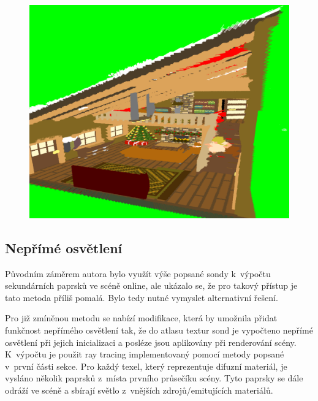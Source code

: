 \begin{figure}[H]
	\centering
	\includegraphics[scale=1]{images/probe_scene_render.png}
	\captionsetup{justification=centering}
	\label{fig:lfp_scene_render}
\end{figure}

\subsection{Nepřímé osvětlení}\label{sec:indirect}
Původním záměrem autora bylo využít výše popsané sondy k~výpočtu sekundárních paprsků ve scéně online, ale ukázalo se, že pro takový přístup je tato metoda příliš pomalá. Bylo tedy nutné vymyslet alternativní řešení. 

Pro již zmíněnou metodu se nabízí modifikace, která by umožnila přidat funkčnost nepřímého osvětlení tak, že do atlasu textur sond je vypočteno nepřímé osvětlení při jejich inicializaci a posléze jsou aplikovány při renderování scény.  K~výpočtu je použit ray tracing implementovaný pomocí metody popsané v~první části sekce. Pro každý texel, který reprezentuje difuzní materiál, je vysláno několik paprsků z~místa prvního průsečíku scény. Tyto paprsky se dále odráží ve scéně a sbírají světlo z~vnějších zdrojů/emitujících materiálů.


